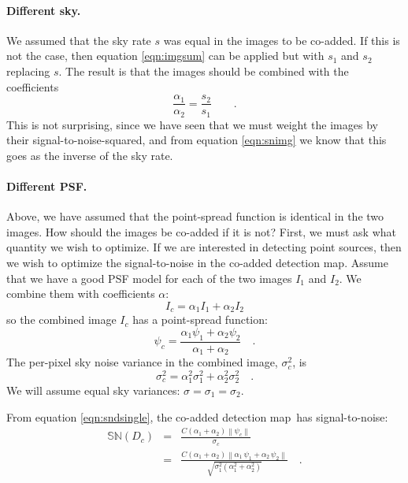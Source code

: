 \documentclass[letterpaper,preprint]{aastex}
\newcommand{\detmap}{detection map}
\newcommand{\psf}{\psi}
\newcommand{\snr}[1]{\mathbb{SN}(#1)}
\newcommand{\norm}[1]{\left\lVert #1 \right\rVert}
\begin{document}
\paragraph{Different sky.}
We assumed that the sky rate $s$ was equal in the images to be
co-added.  If this is not the case, then equation \ref{eqn:imgsum} can
be applied but with $s_1$ and $s_2$ replacing $s$.  The result is that
the images should be combined with the coefficients
\begin{equation}
\frac{\alpha_1}{\alpha_2} = \frac{s_2}{s_1} \qquad .
\end{equation}
This is not surprising, since we have seen that we must weight the
images by their signal-to-noise-squared, and from equation
\ref{eqn:snimg} we know that this goes as the inverse of the sky rate.

\paragraph{Different PSF.}
Above, we have assumed that the point-spread function is identical in
the two images.  How should the images be co-added if it is not?
First, we must ask what quantity we wish to optimize.  If we are
interested in detecting point sources, then we wish to optimize the
signal-to-noise in the co-added \detmap.  Assume that we have a good
PSF model for each of the two images $I_1$ and $I_2$.  We combine them
with coefficients $\alpha$:
\begin{equation}
  I_c = \alpha_1 I_1 + \alpha_2 I_2
\end{equation}
so the combined image $I_c$ has a point-spread function:
\begin{equation}
  \psf_c = \frac{\alpha_1 \psf_1 + \alpha_2 \psf_2}{\alpha_1 + \alpha_2} 
  \quad .
\end{equation}
The per-pixel sky noise variance in the combined image, $\sigma^2_c$, is
\begin{equation}
  \sigma^2_c = \alpha_1^2 \sigma_1^2 + \alpha_2^2 \sigma_2^2 \quad .
\end{equation}
We will assume equal sky variances: $\sigma = \sigma_1 = \sigma_2$.


From equation \ref{eqn:sndsingle}, the co-added \detmap\ has
signal-to-noise:
\begin{eqnarray}
\snr{D_c} &=& \frac{C (\alpha_1 + \alpha_2) \norm{\psf_c}}{\sigma_c} \\
&=& \frac{C (\alpha_1 + \alpha_2) \norm{\alpha_1 \, \psf_1 + \alpha_2 \, \psf_2}}{\sqrt{\sigma_1^2 (\alpha_1^2 + \alpha_2^2)}} \quad .
\end{eqnarray}
\end{document}
